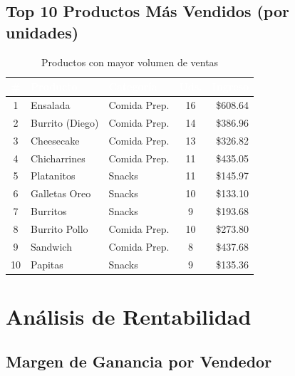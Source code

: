 \documentclass[12pt, a4paper]{article}
\begin{document}
\subsection{Top 10 Productos Más Vendidos (por unidades)}

\begin{table}[H]
\centering
\caption{Productos con mayor volumen de ventas}
\begin{tabular}{c l l c r}
\toprule
\rowcolor{tableheader}
\textcolor{white}{\textbf{\#}} & \textcolor{white}{\textbf{Producto}} & \textcolor{white}{\textbf{Categoría}} & \textcolor{white}{\textbf{Uds.}} & \textcolor{white}{\textbf{Ingreso}} \\
\midrule
1 & Ensalada & Comida Prep. & 16 & \$608.64 \\
\rowcolor{rowalt}
2 & Burrito (Diego) & Comida Prep. & 14 & \$386.96 \\
3 & Cheesecake & Comida Prep. & 13 & \$326.82 \\
\rowcolor{rowalt}
4 & Chicharrines & Comida Prep. & 11 & \$435.05 \\
5 & Platanitos & Snacks & 11 & \$145.97 \\
\rowcolor{rowalt}
6 & Galletas Oreo & Snacks & 10 & \$133.10 \\
7 & Burritos & Snacks & 9 & \$193.68 \\
\rowcolor{rowalt}
8 & Burrito Pollo & Comida Prep. & 10 & \$273.80 \\
9 & Sandwich & Comida Prep. & 8 & \$437.68 \\
\rowcolor{rowalt}
10 & Papitas & Snacks & 9 & \$135.36 \\
\bottomrule
\end{tabular}
\end{table}

\section{Análisis de Rentabilidad}

\subsection{Margen de Ganancia por Vendedor}
\end{document}
